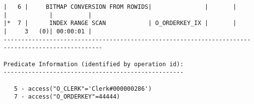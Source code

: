 \documentclass[11pt,a4paper,parskip=half]{scrartcl}
\begin{document}
\begin{lstlisting}
|   6 |     BITMAP CONVERSION FROM ROWIDS|               |       |       |            |          |                                                                                                                                                                                                           
|*  7 |      INDEX RANGE SCAN            | O_ORDERKEY_IX |       |       |     3   (0)| 00:00:01 |                                                                                                                                                                                                           
--------------------------------------------------------------------------------------------------                                                                                                                                                                                                           
                                                                                                                                                                                                                                                                                                             
Predicate Information (identified by operation id):                                                                                                                                                                                                                                                          
---------------------------------------------------                                                                                                                                                                                                                                                          
                                                                                                                                                                                                                                                                                                             
   5 - access("O_CLERK"='Clerk#000000286')                                                                                                                                                                                                                                                                   
   7 - access("O_ORDERKEY"=44444)   
\end{lstlisting}
\end{document}

